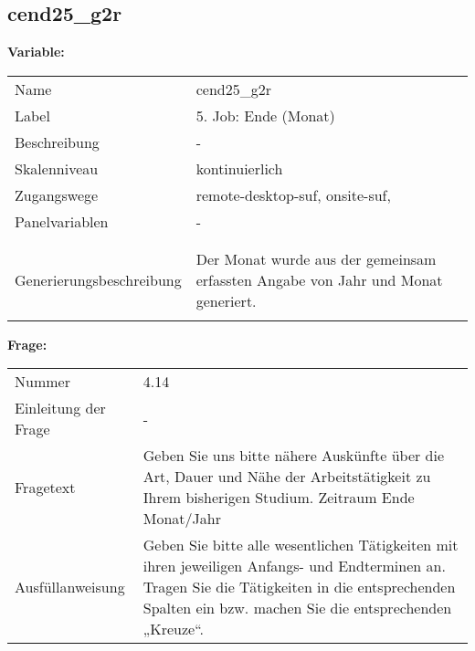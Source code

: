 	
	
	\subsection{cend25\_g2r}
	\label{subSection:cend25_g2r}

	\noindent\textbf{Variable:}\\
		\begin{tabular}{lL{11.3cm}}
			\label{tableVariable:cend25_g2r}
			Name & cend25\_g2r \\
			Label & 5. Job: Ende (Monat) \\
			Beschreibung & - \\
			Skalenniveau & kontinuierlich \\
			Zugangswege &
				remote-desktop-suf,
				onsite-suf,
 \\
			Panelvariablen & -
			 \\
			 \\
 \\
					Generierungsbeschreibung & Der Monat wurde aus der gemeinsam erfassten Angabe von Jahr und Monat generiert. 
				 \\	
			 \\
		\end{tabular}

		\vspace*{1 cm}
		\noindent\textbf{Frage:}\\
		\begin{tabular}{lL{11.3cm}}
			\label{tableQuestion:cend25_g2r}
			Nummer & 4.14 \\
			Einleitung der Frage & - \\
			Fragetext & Geben Sie uns bitte nähere Auskünfte über die Art, Dauer und Nähe der Arbeitstätigkeit zu Ihrem bisherigen Studium.
Zeitraum
Ende Monat/Jahr \\
			Ausfüllanweisung & Geben Sie bitte alle wesentlichen Tätigkeiten mit ihren jeweiligen Anfangs- und Endterminen an. Tragen Sie die Tätigkeiten in die entsprechenden Spalten ein bzw. machen Sie die entsprechenden „Kreuze“. \\
		\end{tabular}




